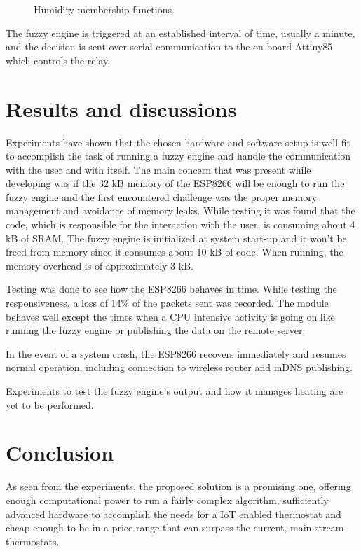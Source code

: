 \documentclass[conference]{IEEEtran}
\let\Oldsection\section
\renewcommand{\section}{\FloatBarrier\Oldsection}
\begin{document}
\begin{figure}[h!]
\label{fig:nn}
\centerline{}
      \caption[MainModule]{Humidity membership functions.}
\label{fig:humidity_mf}
\end{figure}

The fuzzy engine is triggered at an established interval of time, usually a minute, and the decision is sent over
serial communication to the on-board Attiny85 which controls the relay.

\section{Results and discussions}
\label{Results and discussions}

Experiments have shown that the chosen hardware and software setup is well fit to accomplish the task of
running a fuzzy engine and handle the communication with the user and with itself.
The main concern that was present while developing was if the 32 kB memory of the ESP8266 will be enough to run
the fuzzy engine and the first encountered challenge was the proper memory management and avoidance of memory leaks.
While testing it was found that the  code, which is responsible for the interaction with 
the user, is consuming about 4 kB of SRAM. 
The fuzzy engine is initialized at system start-up and it won't be freed from memory since it consumes about 10 kB of code. When running, the memory overhead is of approximately 3 kB.

Testing was done to see how the ESP8266 behaves in time. While testing the responsiveness, a
loss of 14\% of the packets sent was recorded. The module behaves well except the times when a CPU intensive activity is going on like running the fuzzy engine or publishing the data on the remote server.

In the event of a system crash, the ESP8266 recovers immediately and resumes normal operation, including connection
to wireless router and mDNS publishing.

Experiments to test the fuzzy engine's output and how it manages heating are yet to be performed.

\section{Conclusion}
\label{Conclusion}

As seen from the experiments, the proposed solution is a promising one, offering enough computational power
to run a fairly complex algorithm, sufficiently advanced hardware to accomplish the needs for a IoT enabled
thermostat and cheap enough to be in a price range that can surpass the current, main-stream thermostats.



\end{document}
